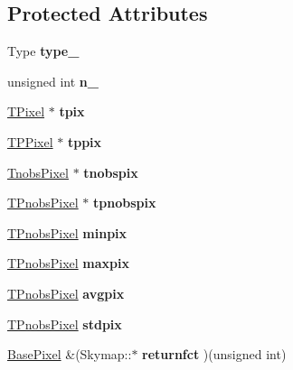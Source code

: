 \subsection*{Protected Attributes}
\begin{DoxyCompactItemize}
\item 
\hypertarget{classSkymap_a43566ad46e5dd5397f61780e896fcd16}{
Type {\bfseries type\_\-}}
\label{classSkymap_a43566ad46e5dd5397f61780e896fcd16}

\item 
\hypertarget{classSkymap_af4d7d674710cda527164130e3d1641a8}{
unsigned int {\bfseries n\_\-}}
\label{classSkymap_af4d7d674710cda527164130e3d1641a8}

\item 
\hypertarget{classSkymap_ac58923522b9db226756edc6225761e0b}{
\hyperlink{classTPixel}{TPixel} $\ast$ {\bfseries tpix}}
\label{classSkymap_ac58923522b9db226756edc6225761e0b}

\item 
\hypertarget{classSkymap_a104ba481c08758174f27901a08763634}{
\hyperlink{classTPPixel}{TPPixel} $\ast$ {\bfseries tppix}}
\label{classSkymap_a104ba481c08758174f27901a08763634}

\item 
\hypertarget{classSkymap_a0943b70a355e1ebd43556dfd396fe300}{
\hyperlink{classTnobsPixel}{TnobsPixel} $\ast$ {\bfseries tnobspix}}
\label{classSkymap_a0943b70a355e1ebd43556dfd396fe300}

\item 
\hypertarget{classSkymap_af0bc0e0d3528395088768c98d80b97ca}{
\hyperlink{classTPnobsPixel}{TPnobsPixel} $\ast$ {\bfseries tpnobspix}}
\label{classSkymap_af0bc0e0d3528395088768c98d80b97ca}

\item 
\hypertarget{classSkymap_a246919d4e10056069969d33c1682245d}{
\hyperlink{classTPnobsPixel}{TPnobsPixel} {\bfseries minpix}}
\label{classSkymap_a246919d4e10056069969d33c1682245d}

\item 
\hypertarget{classSkymap_a9f0e24b96979ef86eed5e326d138cb86}{
\hyperlink{classTPnobsPixel}{TPnobsPixel} {\bfseries maxpix}}
\label{classSkymap_a9f0e24b96979ef86eed5e326d138cb86}

\item 
\hypertarget{classSkymap_a6ee3196efacdcdd2bb6c1f248015204a}{
\hyperlink{classTPnobsPixel}{TPnobsPixel} {\bfseries avgpix}}
\label{classSkymap_a6ee3196efacdcdd2bb6c1f248015204a}

\item 
\hypertarget{classSkymap_a8a50719463edc3fb679848eae1bc236a}{
\hyperlink{classTPnobsPixel}{TPnobsPixel} {\bfseries stdpix}}
\label{classSkymap_a8a50719463edc3fb679848eae1bc236a}

\item 
\hypertarget{classSkymap_ac91e7a47792a35e37398fdbbf61c292c}{
\hyperlink{classBasePixel}{BasePixel} \&(Skymap::$\ast$ {\bfseries returnfct} )(unsigned int)}
\label{classSkymap_ac91e7a47792a35e37398fdbbf61c292c}

\end{DoxyCompactItemize}
